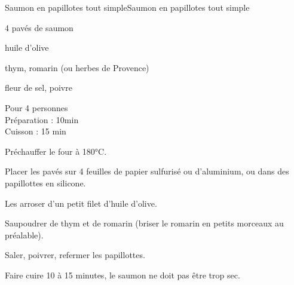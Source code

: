 \begin{recette}{Saumon en papillotes tout simple}{Saumon en papillotes tout simple}

\begin{ingredients}
4 pavés de saumon\par
huile d'olive\par
thym, romarin (ou herbes de Provence)\par
fleur de sel, poivre\par
\end{ingredients}

\begin{infos}
Pour 4 personnes\\
Préparation : 10min\\
Cuisson : 15 min\\
\end{infos}

\begin{etapes}
\item Préchauffer le four à 180°C.
\item Placer les pavés sur 4 feuilles de papier sulfurisé ou d'aluminium, ou dans des papillottes en silicone.
\item Les arroser d'un petit filet d'huile d'olive.
\item Saupoudrer de thym et de romarin (briser le romarin en petits morceaux au préalable).
\item Saler, poivrer, refermer les papillottes.
\item Faire cuire 10 à 15 minutes, le saumon ne doit pas être trop sec.
\end{etapes}

\end{recette}